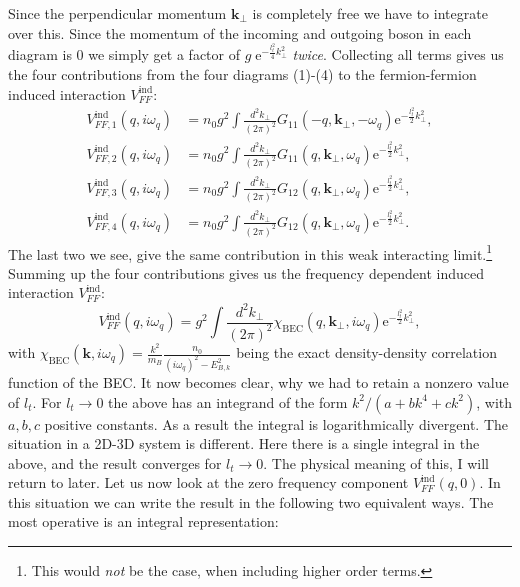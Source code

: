Since the perpendicular momentum $\mathbf{k}_\perp$ is completely free we have to integrate over this. Since the momentum of the incoming and outgoing boson in each diagram is 0 we simply get a factor of $g\; \text{e}^{-\frac{l_t^2}{4}k_\perp^2}$ \textit{twice}. Collecting all terms gives us the four contributions from the four diagrams (1)-(4) to the fermion-fermion induced interaction $V_{FF}^\text{ind}$: 
\begin{align}
V_{FF,1}^\text{ind}(q,i\omega_q) &= n_0g^2\int\frac{d^2k_\perp}{(2\pi)^2}G_{11}(-q,\mathbf{k}_\perp,-\omega_q)\text{e}^{-\frac{l_t^2}{2}k_\perp^2}, \nonumber \\
V_{FF,2}^\text{ind}(q,i\omega_q) &= n_0g^2\int\frac{d^2k_\perp}{(2\pi)^2}G_{11}(q,\mathbf{k}_\perp,\omega_q)\text{e}^{-\frac{l_t^2}{2}k_\perp^2}, \nonumber \\
V_{FF,3}^\text{ind}(q,i\omega_q) &= n_0g^2\int\frac{d^2k_\perp}{(2\pi)^2}G_{12}(q,\mathbf{k}_\perp,\omega_q)\text{e}^{-\frac{l_t^2}{2}k_\perp^2}, \nonumber \\
V_{FF,4}^\text{ind}(q,i\omega_q) &= n_0g^2\int\frac{d^2k_\perp}{(2\pi)^2}G_{12}(q,\mathbf{k}_\perp,\omega_q)\text{e}^{-\frac{l_t^2}{2}k_\perp^2}. 
\end{align}
The last two we see, give the same contribution in this weak interacting limit.\footnote{This would \textit{not} be the case, when including higher order terms.} Summing up the four contributions gives us the frequency dependent induced interaction $V_{FF}^\text{ind}$:
\begin{equation}
V_{FF}^\text{ind}(q,i\omega_q) = g^2\int\frac{d^2k_\perp}{(2\pi)^2}\chi_\text{BEC}(q,\mathbf{k}_\perp,i\omega_q)\text{e}^{-\frac{l_t^2}{2}k_\perp^2}, 
\label{eq.VFFindXBEC}
\end{equation}
with $\chi_\text{BEC}(\mathbf{k},i\omega_q) = \frac{k^2}{m_B}\frac{n_0}{(i\omega_q)^2-E_{B,k}^2}$ being the exact density-density correlation function of the BEC. It now becomes clear, why we had to retain a nonzero value of $l_t$. For $l_t\to 0$ the above has an integrand of the form $k^2/(a+bk^4+ck^2)$, with $a,b,c$ positive constants. As a result the integral is logarithmically divergent. The situation in a 2D-3D system is different. Here there is a single integral in the above, and the result converges for $l_t\to 0$. The physical meaning of this, I will return to later. Let us now look at the zero frequency component $V_{FF}^\text{ind}(q,0)$. In this situation we can write the result in the following two equivalent ways. The most operative is an integral representation:
